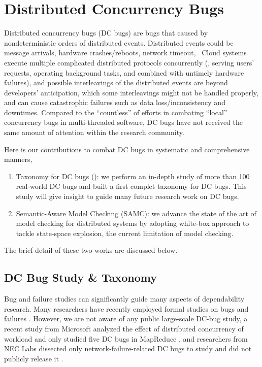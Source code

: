 \section{Distributed Concurrency Bugs}

Distributed concurrency bugs (DC bugs) are bugs that caused by nondeterministic
orders of distributed events. Distributed events could be message arrivals,
hardware crashes/reboots, network timeout, \etc\ Cloud systems execute multiple
complicated distributed protocols concurrently (\eg, serving users' requests,
operating background tasks, and combined with untimely hardware failures), and
possible interleavings of the distributed events are beyond developers'
anticipation, which some interleavings might not be handled properly, and can
cause catastrophic failures such as data loss/inconsistency and downtimes.
Compared to the ``countless'' of efforts in combating ``local'' concurrency bugs
in multi-threaded software, DC bugs have not received the same amount of
attention within the research community.

Here is our contributions to combat DC bugs in systematic and comprehensive manners,

\begin{enumerate}

\item Taxonomy for DC bugs (\taxdc): we perform an in-depth study of more than
100 real-world DC bugs and built a first complet taxonomy for DC bugs. This
study will give insight to guide many future research work on DC bugs.

\item Semantic-Aware Model Checking (SAMC): we advance the state of the art of
model checking for distributed systems by adopting white-box approach to tackle
state-space explosion, the current limitation of model checking.

\end{enumerate}

The brief detail of these two works are discussed below.

\subsection{DC Bug Study \& Taxonomy}

Bug and failure studies can significantly guide many aspects of dependability
research. Many researchers have recently employed formal studies on bugs and
failures \cite{Jin+12-PerformanceBugs, Li+13-ScopeBugStudy, Li+07-MemoryErrors,
Lu+08-ConcurrencyBugStudy, Sahoo+10-StudyBugsServerSoftware,
SridharanLiberty12-StudyDRAMFailures, Xiao+14-NonDetMR,
Yin+11-StudyConfErrors}.
%
However, we are not aware of any public large-scale DC-bug study, a recent study
from Microsoft analyzed the effect of distributed concurrency of workload and
only studied five DC bugs in MapReduce \cite{Xiao+14-NonDetMR}, and researchers
from NEC Labs dissected only network-failure-related DC bugs to study and did
not publicly release it \cite{Joshi+13-SetsudoTesting}.

